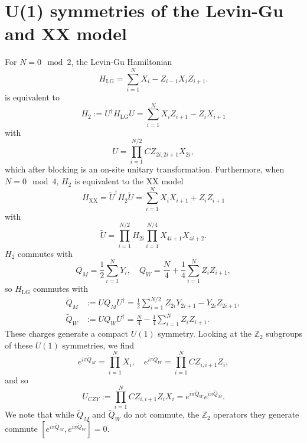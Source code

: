 \documentclass[prx, twocolumn, superscriptaddress, dvipsnames]{revtex4-2}
\theoremstyle{definition}
\begin{document}
\section{U(1) symmetries of the Levin-Gu and XX model}
\label{app:anomaly}
For $N = 0 \mod 2$, the Levin-Gu Hamiltonian
\begin{equation}
    H_{\text{LG}} = \sum_{i=1}^{N} X_i - Z_{i-1} X_i Z_{i+1}.
\end{equation}
is equivalent to
\begin{equation}
    H_2 := U^\dag H_{\text{LG}} U = \sum_{i=1}^{N} X_i Z_{i+1} - Z_{i} X_{i+1}
\end{equation}
with
\begin{equation}
    U = \prod_{i=1}^{N/2} CZ_{2i,2i+1} X_{2i},
\end{equation}
which after blocking is an on-site unitary transformation. Furthermore, when $N = 0 \mod 4$, $H_2$ is equivalent to the XX model
\begin{equation}
    H_{\text{XX}} = \tilde U^\dag H_2 \tilde U = \sum_{i=1}^{N} X_i X_{i+1} + Z_i Z_{i+1}
\end{equation}
with
\begin{equation}
    \tilde U = \prod_{i=1}^{N/2} H_{2i} \prod_{i=1}^{N/4} X_{4i+1} X_{4i+2}.
\end{equation}
$H_2$ commutes with
\begin{equation}
    Q_M = \frac{1}{2} \sum_{i=1}^{N} Y_i, \quad Q_W =  \frac{N}{4} + \frac{1}{4} \sum_{i=1}^{N} Z_i Z_{i+1},
\end{equation}
so $H_{\text{LG}}$ commutes with
\begin{align}
    \tilde Q_M &:= U Q_M U^\dag = \frac{1}{2} \sum_{i=1}^{N/2} Z_{2i} Y_{2i+1} - Y_{2i} Z_{2i+1},\\
    \tilde Q_W &:= U Q_W U^\dag = \frac{N}{4} - \frac{1}{4} \sum_{i=1}^{N} Z_i Z_{i+1}.
\end{align}
These charges generate a compact $U(1)$ symmetry. Looking at the $\mathbb Z_2$ subgroups of these $U(1)$ symmetries, we find
\begin{equation}
    e^{i\pi \tilde Q_M} = \prod_{i=1}^N X_i, \quad e^{i\pi \tilde Q_W} = \prod_{i=1}^N CZ_{i,i+1} Z_i,
\end{equation}
and so
\begin{equation}
    U_{CZY} := \prod_{i=1}^N CZ_{i,i+1} Z_i X_i = e^{i\pi \tilde Q_W} e^{i\pi \tilde Q_M}. 
\end{equation}
We note that while $\tilde{Q}_M$ and $\tilde{Q}_W$ do not commute, the $\mathbb{Z}_2$ operators they generate commute $[e^{i\pi \tilde Q_M},e^{i\pi \tilde Q_W}]=0$. 
\end{document}
